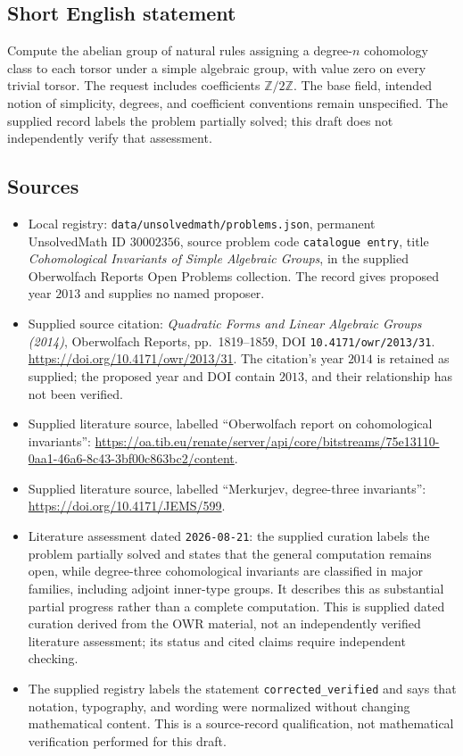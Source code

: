 \documentclass[11pt]{article}
\newcommand{\Z}{\mathbb{Z}}
\begin{document}
\subsection{Short English statement}
Compute the abelian group of natural rules assigning a degree-\(n\) cohomology class to each torsor under a simple algebraic group, with value zero on every trivial torsor. The request includes coefficients \(\Z/2\Z\). The base field, intended notion of simplicity, degrees, and coefficient conventions remain unspecified. The supplied record labels the problem partially solved; this draft does not independently verify that assessment.
\subsection{Sources}
\begin{itemize}
\item Local registry: \texttt{data/unsolvedmath/problems.json}, permanent UnsolvedMath ID \(30002356\), source problem code \texttt{catalogue entry}, title \emph{Cohomological Invariants of Simple Algebraic Groups}, in the supplied Oberwolfach Reports Open Problems collection. The record gives proposed year \(2013\) and supplies no named proposer.
\item Supplied source citation: \emph{Quadratic Forms and Linear Algebraic Groups (2014)}, Oberwolfach Reports, pp.~1819--1859, DOI \texttt{10.4171/owr/2013/31}. \url{https://doi.org/10.4171/owr/2013/31}. The citation's year \(2014\) is retained as supplied; the proposed year and DOI contain \(2013\), and their relationship has not been verified.
\item Supplied literature source, labelled ``Oberwolfach report on cohomological invariants'': \url{https://oa.tib.eu/renate/server/api/core/bitstreams/75e13110-0aa1-46a6-8c43-3bf00c863bc2/content}.
\item Supplied literature source, labelled ``Merkurjev, degree-three invariants'': \url{https://doi.org/10.4171/JEMS/599}.
\item Literature assessment dated \texttt{2026-08-21}: the supplied curation labels the problem partially solved and states that the general computation remains open, while degree-three cohomological invariants are classified in major families, including adjoint inner-type groups. It describes this as substantial partial progress rather than a complete computation. This is supplied dated curation derived from the OWR material, not an independently verified literature assessment; its status and cited claims require independent checking.
\item The supplied registry labels the statement \texttt{corrected\_verified} and says that notation, typography, and wording were normalized without changing mathematical content. This is a source-record qualification, not mathematical verification performed for this draft.
\end{itemize}
\end{document}
